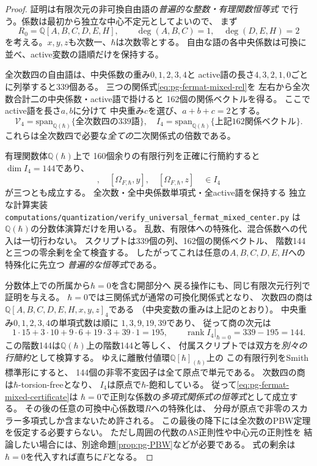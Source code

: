 \begin{proof}
証明は有限次元の非可換自由語の\emph{普遍的な整数・有理関数恒等式}
で行う。係数は最初から独立な中心不定元としてよいので、
まず
\begin{equation}
 R_0=\mathbb Q[A,B,C,D,E,H],\qquad
 \deg(A,B,C)=1,\quad\deg(D,E,H)=2
\end{equation}
を考える。$x,y,z$も次数一、$\hbar$は次数零とする。
自由な語の各中央係数は可換に並べ、active変数の語順だけを保持する。

全次数四の自由語は、中央係数の重み$0,1,2,3,4$と
active語の長さ$4,3,2,1,0$ごとに列挙すると339個ある。
三つの関係式\eqref{eq:pg-fermat-mixed-rel}を
左右から全次数合計二の中央係数・active語で掛けると
162個の関係ベクトルを得る。
ここでactive語を長さ$a,b$に分けて
中央重み$c$を選び、$a+b+c=2$とする。
\begin{equation}
 \mathcal V_4=\mathrm{span}_{\mathbb Q(\hbar)}
  \{\text{全次数四の339語}\},\quad
 I_4=\mathrm{span}_{\mathbb Q(\hbar)}
  \{\text{上記162関係ベクトル}\}.
\end{equation}
これらは全次数四で必要な\emph{全ての}二次関係式の倍数である。

有理関数体$\mathbb Q(\hbar)$上で
160個余りの有限行列を正確に行簡約すると
$\dim I_4=144$であり、
\begin{equation}
 [\Omega_{F,\hbar},x],\quad
 [\Omega_{F,\hbar},y],\quad
 [\Omega_{F,\hbar},z]
 \quad\in I_4
 \label{eq:pg-fermat-mixed-certificate}
\end{equation}
が三つとも成立する。
全次数・全中央係数単項式・全active語を保持する
独立な計算実装
\texttt{computations/quantization/verify\_universal\_fermat\_mixed\_center.py}
は$\mathbb Q(\hbar)$の分数体演算だけを用いる。
乱数、有限体への特殊化、混合係数への代入は一切行わない。
スクリプトは339個の列、162個の関係ベクトル、
階数144と三つの零余剰を全て検査する。
したがってこれは任意の$A,B,C,D,E,H$への特殊化に先立つ
\emph{普遍的な恒等式}である。

分数体上での所属から$\hbar=0$を含む開部分へ
戻る操作にも、同じ有限次元行列で証明を与える。
$\hbar=0$では三関係式が通常の可換化関係式となり、
次数四の商は
$\mathbb Q[A,B,C,D,E,H,x,y,z]_4$である
（中央変数の重みは上記のとおり）。
中央重み$0,1,2,3,4$の単項式数は順に
$1,3,9,19,39$であり、
従って商の次元は
\begin{equation}
 1\cdot15+3\cdot10+9\cdot6+19\cdot3+39\cdot1
 =195,\qquad
 \operatorname{rank}I_4|_{\hbar=0}=339-195=144.
\end{equation}
この階数144は$\mathbb Q(\hbar)$上の階数144と等しく、
付属スクリプトでは双方を\emph{別々の行簡約}として検算する。
ゆえに離散付値環$\mathbb Q[\hbar]_{(\hbar)}$上の
この有限行列をSmith標準形にすると、
144個の非零不変因子は全て原点で単元である。
次数四の商は$\hbar$-torsion-freeとなり、
$I_4$は原点で$\hbar$-飽和している。
従って\eqref{eq:pg-fermat-mixed-certificate}は
$\hbar=0$で正則な係数の\emph{多項式関係式の恒等式}として成立する。
その後の任意の可換中心係数環$R$への特殊化は、
分母が原点で非零のスカラー多項式しか含まないため許される。
この最後の降下には全次数のPBW定理を仮定する必要すらない。
ただし周囲の代数のAS正則性や中心元の正則性を
結論したい場合には、別途命題\ref{prop:pg-PBW}などが必要である。
式の剰余は$\hbar=0$を代入すれば直ちに$F$となる。
\end{proof}

